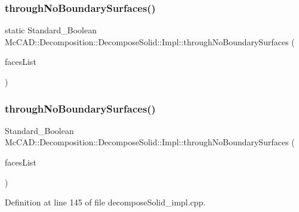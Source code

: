 \subsubsection{\texorpdfstring{through\+No\+Boundary\+Surfaces()}{throughNoBoundarySurfaces()}\hspace{0.1cm}{\footnotesize\ttfamily [1/2]}}
{\footnotesize\ttfamily static Standard\+\_\+\+Boolean Mc\+C\+A\+D\+::\+Decomposition\+::\+Decompose\+Solid\+::\+Impl\+::through\+No\+Boundary\+Surfaces (\begin{DoxyParamCaption}\item[{const std\+::vector$<$ std\+::shared\+\_\+ptr$<$ \hyperlink{classMcCAD_1_1Geometry_1_1BoundSurface}{Geometry\+::\+Bound\+Surface} $>$$>$ \&}]{faces\+List }\end{DoxyParamCaption})\hspace{0.3cm}{\ttfamily [static]}}

\mbox{\label{classMcCAD_1_1Decomposition_1_1DecomposeSolid_1_1Impl_aade70e5860e8ee29ff8f9e4c4cfc53b9}} 
\subsubsection{\texorpdfstring{through\+No\+Boundary\+Surfaces()}{throughNoBoundarySurfaces()}\hspace{0.1cm}{\footnotesize\ttfamily [2/2]}}
{\footnotesize\ttfamily Standard\+\_\+\+Boolean Mc\+C\+A\+D\+::\+Decomposition\+::\+Decompose\+Solid\+::\+Impl\+::through\+No\+Boundary\+Surfaces (\begin{DoxyParamCaption}\item[{const std\+::vector$<$ std\+::shared\+\_\+ptr$<$ \hyperlink{classMcCAD_1_1Geometry_1_1BoundSurface}{Geometry\+::\+Bound\+Surface} $>$$>$ \&}]{faces\+List }\end{DoxyParamCaption})\hspace{0.3cm}{\ttfamily [static]}}



Definition at line 145 of file decompose\+Solid\+\_\+impl.\+cpp.


